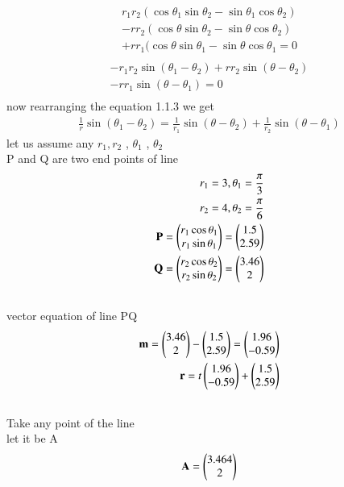\documentclass[journal,12pt,twocolumn]{IEEEtran}
\renewcommand\thesection{\arabic{section}}
\begin{document}
\begin{enumerate}[label=\thesection.\arabic*.,ref=\thesection.\theenumi]
\begin{align}\nonumber
 r_1r_2(\cos\theta_1\sin\theta_2-\sin\theta_1\cos\theta_2)\\\nonumber
 -rr_2(\cos\theta\sin\theta_2-\sin\theta\cos\theta_2)\\\nonumber
 +rr_1(\cos\theta\sin\theta_1-\sin\theta\cos\theta_1=0\\
\end{align}
\begin{align}\nonumber
-r_1r_2\sin(\theta_1-\theta_2)+rr_2\sin(\theta-\theta_2)\\\nonumber
-rr_1\sin(\theta-\theta_1)=0\\
\end{align}
now rearranging the equation 1.1.3 we get 
\begin{align}
\frac{1}{r} \sin{(\theta_1-\theta_2)}=\frac{1}{r_1} \sin{(\theta-\theta_2)}+\frac{1}{r_2} \sin{(\theta-\theta_1)}
 \end{align}
 let us assume  any   $r_1 , r_2$ , $\theta_1$ , $\theta_2$\\
 P and Q are two end points of line
 \begin{align}
     r_1=3  ,\theta_1=\frac{\pi}{3}\\
     r_2=4  ,\theta_2=\frac{\pi}{6}\\
     \mathbf{P}=\begin{pmatrix}r_1\cos\theta_1\\r_1\sin\theta_1\end{pmatrix}=\begin{pmatrix}1.5\\2.59\end{pmatrix}\\
     \mathbf{Q}=\begin{pmatrix}r_2\cos\theta_2\\r_2\sin\theta_2\end{pmatrix}=\begin{pmatrix}3.46\\2\end{pmatrix}\\\nonumber
 \end{align}
 vector equation of line PQ
 \begin{align}
      \mathbf{m}=\begin{pmatrix}3.46\\2\end{pmatrix}-\begin{pmatrix}1.5\\2.59\end{pmatrix}=\begin{pmatrix}1.96\\-0.59\end{pmatrix}\\
     \mathbf{r}=t\begin{pmatrix}1.96\\-0.59\end{pmatrix}+\begin{pmatrix}1.5\\2.59\end{pmatrix}\\\nonumber
 \end{align}
 Take any point of the line \\
 let it be A\\
\begin{align}
\vec{A}=\myvec{3.464\\2}\\

\end{align}
\end{enumerate}
\end{document}
